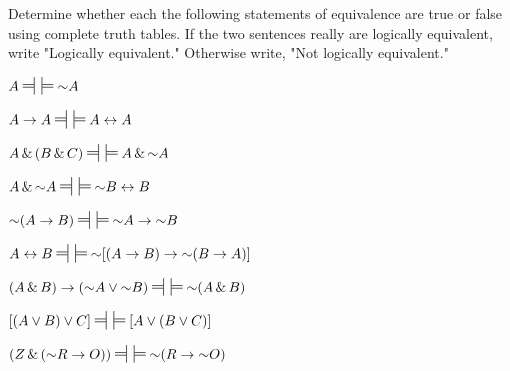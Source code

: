 \noindent\problempart
\label{pr.TT.equiv}
Determine whether each the following statements of equivalence are true or false using complete truth tables. If the two sentences really are logically equivalent, write "Logically equivalent." Otherwise write, "Not logically equivalent." 
\begin{earg}
\item $A\ndststile{}{} \hspace{.5em} \sdtstile{}{}\enot A$\vspace{.5ex} 											%
\item $A\eif A\ndststile{}{} \hspace{.5em} \sdtstile{}{}A \eiff A$\vspace{.5ex} 									%
\item $A	\eand (B	\eand C)\ndststile{}{} \hspace{.5em} \sdtstile{}{} A \eand \enot A$\vspace{.5ex}  					%
\item $A \eand \enot A\ndststile{}{} \hspace{.5em} \sdtstile{}{}\enot B \eiff B$ \vspace{.5ex}						%
\item $\enot(A \eif B)\ndststile{}{} \hspace{.5em} \sdtstile{}{}\enot A \eif \enot B$\vspace{.5ex}					%
\item $A \eiff B\ndststile{}{} \hspace{.5em} \sdtstile{}{}\enot[(A \eif B) \eif \enot (B\eif A)]$\vspace{.5ex}			%
\item $(A \eand B) \eif (\enot A \eor \enot B)\ndststile{}{} \hspace{.5em} \sdtstile{}{} \enot(A\eand B)$\vspace{.5ex}	%
\item $[(A \eor B) \eor C]\ndststile{}{} \hspace{.5em} \sdtstile{}{}[A \eor (B \eor C)]$\vspace{.5ex} 				%
\item $ (Z \eand (\enot R \eif O))\ndststile{}{} \hspace{.5em} \sdtstile{}{} \enot (R \eif \enot O) $\vspace{.5ex}		%

\end{earg}

